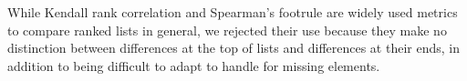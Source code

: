 While Kendall rank correlation \cite{kendallNewMeasureRank1938c} and Spearman's footrule  \cite{spearmanCorrelationCalculatedFaulty1910} are widely used metrics to compare ranked lists in general, we rejected their use because they make no distinction between differences at the top of lists and differences at their ends, in addition to being difficult to adapt to handle for missing elements.

%
%
%
%
%
%
%
%
%


